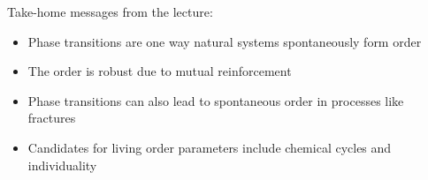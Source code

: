 \documentclass[]{article}
\begin{document}
\begin{appendices}
Take-home messages from the lecture:
\begin{itemize}
	\item Phase transitions are one way natural systems  spontaneously form order
	\item The order is robust due to mutual reinforcement
	\item Phase transitions can also lead to spontaneous order in processes like fractures
	\item Candidates for living order parameters include chemical cycles and individuality
\end{itemize}


\end{appendices}

\printglossaries

 


\end{document}

